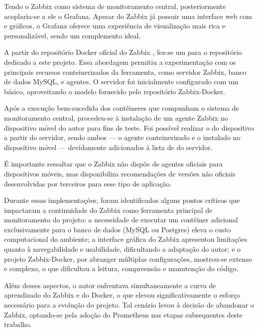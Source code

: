 Tendo o Zabbix como sistema de monitoramento central, posteriormente aco\-plaria-se a ele o Grafana. Apesar do Zabbix já possuir uma interface web com  e gráficos, o Grafana oferece uma experiência de visualização mais rica e personalizável, sendo um complemento ideal.

A partir do repositório Docker oficial do Zabbix  \citep{zabbixdocker2025}, fez-se um  para o repositório dedicado a este projeto. Essa abordagem permitiu a experimentação com os principais recursos conteinerizados da ferramenta, como servidor Zabbix, banco de dados MySQL, e agentes. O servidor foi inicialmente configurado com um  básico, aproveitando o modelo fornecido pelo repositório Zabbix-Docker.

Após a execução bem-sucedida dos contêineres que compunham o sistema de monitoramento central, procedeu-se à instalação de um agente Zabbix no dispositivo móvel do autor para fins de teste. Foi possível realizar o  do dispositivo a partir do servidor, sendo ambos — o agente conteinerizado e o instalado no dispositivo móvel — devidamente adicionados à lista de  do servidor.

É importante ressaltar que o Zabbix não dispõe de agentes oficiais para dispositivos móveis, mas disponibiliza recomendações de versões não oficiais desenvolvidas por terceiros para esse tipo de aplicação.

Durante essas implementações, foram identificados alguns pontos críticos que impactaram a continuidade do Zabbix como ferramenta principal de monitoramento do projeto: a necessidade de executar um contêiner adicional exclusivamente para o banco de dados (MySQL ou Postgres) eleva o custo computacional do ambiente; a interface gráfica do Zabbix apresentou limitações quanto à navegabilidade e usabilidade, dificultando a adaptação do autor; e o projeto Zabbix-Docker, por abranger múltiplas configurações, mostrou-se extenso e complexo, o que dificultou a leitura, compreensão e manutenção do código.

Além desses aspectos, o autor enfrentava simultaneamente a curva de aprendizado do Zabbix e do Docker, o que elevou significativamente o esforço necessário para a evolução do projeto. Tal cenário levou à decisão de abandonar o Zabbix, optando-se pela adoção do Prometheus nas etapas subsequentes deste trabalho.

